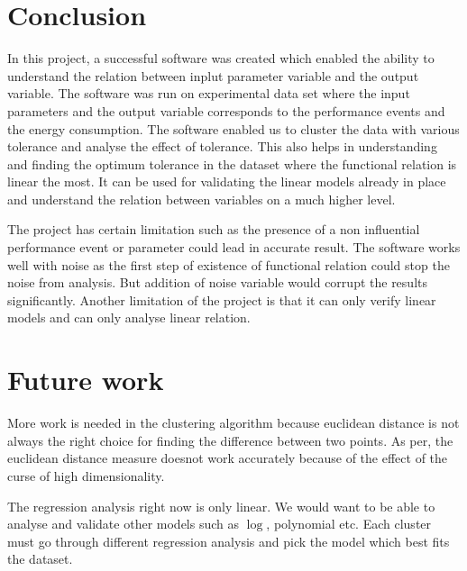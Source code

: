 \section{Conclusion}

In this project, a successful software was created which enabled the ability to understand the relation between inplut parameter variable and the output variable. The software was run on experimental data set where the input parameters and the output variable corresponds to the performance events and the energy consumption. The software enabled us to cluster the data with various tolerance and analyse the effect of tolerance. This also helps in understanding and finding the optimum tolerance in the dataset where the functional relation is linear the most. It can be used for validating the linear models already in place and understand the relation between variables on a much higher level.

The project has certain limitation such as the presence of a non influential performance event or parameter could lead in accurate result. The software works well with noise as the first step of existence of functional relation could stop the noise from analysis. But addition of noise variable would corrupt the results significantly. Another limitation of the project is that it can only verify linear models and can only analyse linear relation.

\section{Future work}

More work is needed in the clustering algorithm because euclidean distance is not always the right choice for finding the difference between two points. As per\cite{aggarwal2001surprising}, the euclidean distance measure doesnot work accurately because of the effect of the curse of high dimensionality.

The regression analysis right now is only linear. We would want to be able to analyse and validate other models such as \(\log\), polynomial etc. Each cluster must go through different regression analysis and pick the model which best fits the dataset.